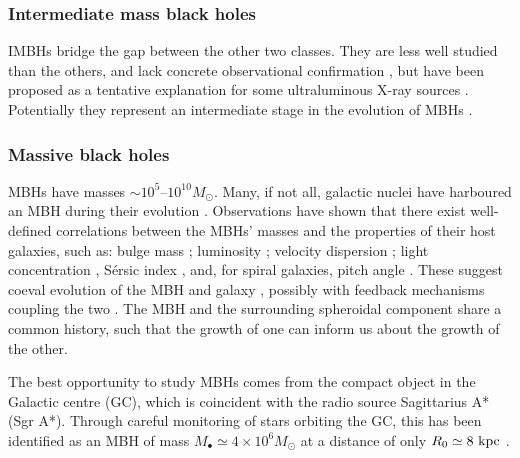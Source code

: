 \subsubsection{Intermediate mass black holes}

IMBHs bridge the gap between the other two classes. They are less well studied than the others, and lack concrete observational confirmation \citep{Miller2009a}, but have been proposed as a tentative explanation for some ultraluminous X-ray sources \citep{Feng2011}. Potentially they represent an intermediate stage in the evolution of MBHs \citep{Graham2013}.

\subsubsection{Massive black holes}

MBHs have masses $\sim10^5$--$10^{10} M_\odot$. Many, if not all, galactic nuclei have harboured an MBH during their evolution \citep{Lynden-Bell1971, Soltan1982, Rees1984}. Observations have shown that there exist well-defined correlations between the MBHs' masses and the properties of their host galaxies, such as: bulge mass \citep{Kormendy1995,Haring2004,Graham2012a}; luminosity \citep{Magorrian1998,Marconi2003,Graham2013}; velocity dispersion \citep{Ferrarese2000,Gebhardt2000,Tremaine2002,Graham2011}; light concentration \citep{Graham2001}, S{\'e}rsic index \citep{Graham2007a,Savorgnan2013}, and, for spiral galaxies, pitch angle \citep{Seigar2008,Berrier2013}. These suggest coeval evolution of the MBH and galaxy \citep{Peng2007, Jahnke2011}, possibly with feedback mechanisms coupling the two \citep{Haiman2004, Volonteri2009}. The MBH and the surrounding spheroidal component share a common history, such that the growth of one can inform us about the growth of the other.

The best opportunity to study MBHs comes from the compact object in the Galactic centre (GC), which is coincident with the radio source Sagittarius A* (Sgr A*). Through careful monitoring of stars orbiting the GC, this has been identified as an MBH of mass $M_\bullet \simeq 4 \times 10^6 M_\odot$ at a distance of only $R_0 \simeq 8~\mathrm{kpc}$ \citep{Gillessen2009, Meyer2012}.

